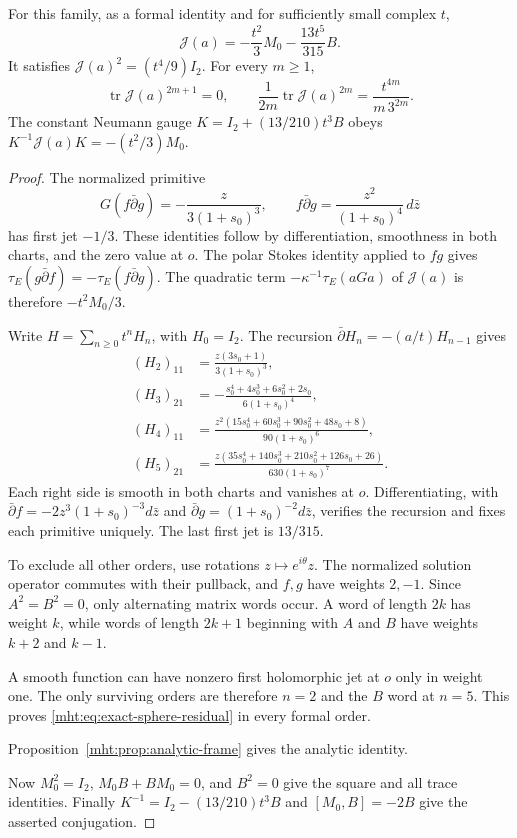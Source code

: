 \begin{theorem}\label{mht:thm:exact-sphere-residual}
For this family, as a formal identity and for sufficiently small
complex $t$,
\begin{equation}\label{mht:eq:exact-sphere-residual}
 \mathcal J(a)=-\frac{t^2}{3}M_0-\frac{13t^5}{315}B.
\end{equation}
It satisfies $\mathcal J(a)^2=(t^4/9)I_2$. For every $m\geq1$,
\begin{equation}\label{mht:eq:exact-sphere-invariants}
 \operatorname{tr}\mathcal J(a)^{2m+1}=0,\qquad
 \frac1{2m}\operatorname{tr}\mathcal J(a)^{2m}
       =\frac{t^{4m}}{m\,3^{2m}}.
\end{equation}
The constant Neumann gauge $K=I_2+(13/210)t^3B$ obeys
$K^{-1}\mathcal J(a)K=-(t^2/3)M_0$.
\end{theorem}

\begin{proof}
The normalized primitive
\[
 G(f\bar\partial g)=-\frac{z}{3(1+s_0)^3},
 \qquad f\bar\partial g=\frac{z^2}{(1+s_0)^4}\,d\bar z
\]
has first jet $-1/3$. These identities follow by differentiation,
smoothness in both charts, and the zero value at $o$.
The polar Stokes identity applied to $fg$ gives
$\tau_E(g\bar\partial f)=-\tau_E(f\bar\partial g)$.
The quadratic term
$-\kappa^{-1}\tau_E(aGa)$ of $\mathcal J(a)$ is therefore
$-t^2M_0/3$.

Write $H=\sum_{n\geq0}t^nH_n$, with $H_0=I_2$. The recursion
$\bar\partial H_n=-(a/t)H_{n-1}$ gives
\begin{align*}
 (H_2)_{11}&=\frac{z(3s_0+1)}{3(1+s_0)^3},\\
 (H_3)_{21}&=-\frac{s_0^4+4s_0^3+6s_0^2+2s_0}{6(1+s_0)^4},\\
 (H_4)_{11}&=\frac{z^2(15s_0^4+60s_0^3+90s_0^2+48s_0+8)}
                         {90(1+s_0)^6},\\
 (H_5)_{21}&=\frac{z(35s_0^4+140s_0^3+210s_0^2+126s_0+26)}
                         {630(1+s_0)^7}.
\end{align*}
Each right side is smooth in both charts and vanishes at $o$.
Differentiating, with
$\bar\partial f=-2z^3(1+s_0)^{-3}d\bar z$ and
$\bar\partial g=(1+s_0)^{-2}d\bar z$, verifies the recursion
and fixes each primitive uniquely. The last first jet is $13/315$.

To exclude all other orders, use rotations $z\mapsto e^{i\theta}z$.
The normalized solution operator commutes with their pullback, and
$f,g$ have weights $2,-1$. Since $A^2=B^2=0$, only alternating matrix
words occur. A word of length $2k$ has weight $k$, while words of length
$2k+1$ beginning with $A$ and $B$ have weights $k+2$ and $k-1$.

A smooth function can have nonzero first holomorphic jet at $o$ only
in weight one. The only surviving orders are therefore $n=2$ and the
$B$ word at $n=5$. This proves \eqref{mht:eq:exact-sphere-residual}
in every formal order.

Proposition~\ref{mht:prop:analytic-frame}
gives the analytic identity.

Now $M_0^2=I_2$, $M_0B+BM_0=0$, and $B^2=0$ give the square and all
trace identities. Finally $K^{-1}=I_2-(13/210)t^3B$ and
$[M_0,B]=-2B$ give the asserted conjugation.
\end{proof}

